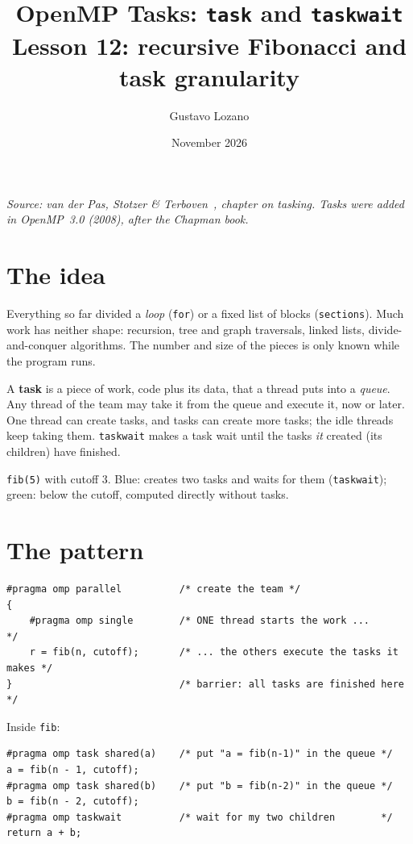 \documentclass[11pt,a4paper]{article}
\title{\textbf{OpenMP Tasks: \texttt{task} and \texttt{taskwait}}\\[4pt]\large Lesson 12: recursive Fibonacci and task granularity}
\author{Gustavo Lozano}
\date{November 2026}
\let\origtexttt\texttt
\renewcommand{\texttt}[1]{\textcolor{black!60}{\origtexttt{#1}}}
\begin{document}
\maketitle

\noindent\textit{\small Source: van der Pas, Stotzer \& Terboven~\cite{vdp}, chapter on
tasking. Tasks were added in OpenMP~3.0 (2008), after the Chapman book.}

\section{The idea}
Everything so far divided a \emph{loop} (\texttt{for}) or a fixed list of blocks
(\texttt{sections}). Much work has neither shape: recursion, tree and graph traversals,
linked lists, divide-and-conquer algorithms. The number and size of the pieces is only
known while the program runs.

A \textbf{task} is a piece of work, code plus its data, that a thread puts into a
\emph{queue}. Any thread of the team may take it from the queue and execute it, now or
later. One thread can create tasks, and tasks can create more tasks; the idle threads keep
taking them. \texttt{taskwait} makes a task wait until the tasks \emph{it} created
(its children) have finished.

\begin{center}

\small \texttt{fib(5)} with cutoff 3. Blue: creates two tasks and waits for them
(\texttt{taskwait}); green: below the cutoff, computed directly without tasks.
\end{center}

\section{The pattern}
\begin{lstlisting}
#pragma omp parallel          /* create the team */
{
    #pragma omp single        /* ONE thread starts the work ...            */
    r = fib(n, cutoff);       /* ... the others execute the tasks it makes */
}                             /* barrier: all tasks are finished here      */
\end{lstlisting}
Inside \texttt{fib}:
\begin{lstlisting}
#pragma omp task shared(a)    /* put "a = fib(n-1)" in the queue */
a = fib(n - 1, cutoff);
#pragma omp task shared(b)    /* put "b = fib(n-2)" in the queue */
b = fib(n - 2, cutoff);
#pragma omp taskwait          /* wait for my two children        */
return a + b;
\end{lstlisting}
\end{document}
